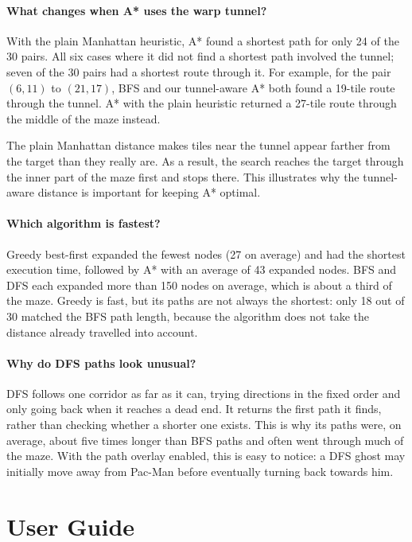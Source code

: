 \documentclass[12pt,a4paper]{article}
\begin{document}
\paragraph{What changes when A* uses the warp tunnel?} With the plain Manhattan heuristic, A* found a shortest path for only 24 of the 30 pairs. All six cases where it did not find a shortest path involved the tunnel; seven of the 30 pairs had a shortest route through it. For example, for the pair $(6,11)$ to $(21,17)$, BFS and our tunnel-aware A* both found a 19-tile route through the tunnel. A* with the plain heuristic returned a 27-tile route through the middle of the maze instead.

The plain Manhattan distance makes tiles near the tunnel appear farther from the target than they really are. As a result, the search reaches the target through the inner part of the maze first and stops there. This illustrates why the tunnel-aware distance is important for keeping A* optimal.

\paragraph{Which algorithm is fastest?} Greedy best-first expanded the fewest nodes (27 on average) and had the shortest execution time, followed by A* with an average of 43 expanded nodes. BFS and DFS each expanded more than 150 nodes on average, which is about a third of the maze. Greedy is fast, but its paths are not always the shortest: only 18 out of 30 matched the BFS path length, because the algorithm does not take the distance already travelled into account.

\paragraph{Why do DFS paths look unusual?} DFS follows one corridor as far as it can, trying directions in the fixed order and only going back when it reaches a dead end. It returns the first path it finds, rather than checking whether a shorter one exists. This is why its paths were, on average, about five times longer than BFS paths and often went through much of the maze. With the path overlay enabled, this is easy to notice: a DFS ghost may initially move away from Pac-Man before eventually turning back towards him.

\section{User Guide}
\label{sec:guide}
\end{document}
